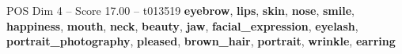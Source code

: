 \begin{textsample}{POS Dim 4 – Score 17.00 – t013519}  \label{ex:f4_pos_036}
\textbf{eyebrow}, \textbf{lips}, \textbf{skin}, \textbf{nose}, \textbf{smile}, \textbf{happiness}, \textbf{mouth}, \textbf{neck}, \textbf{beauty}, \textbf{jaw}, \textbf{facial\_expression}, \textbf{eyelash}, \textbf{portrait\_photography}, \textbf{pleased}, \textbf{brown\_hair}, \textbf{portrait}, \textbf{wrinkle}, \textbf{earring}

\end{textsample}
